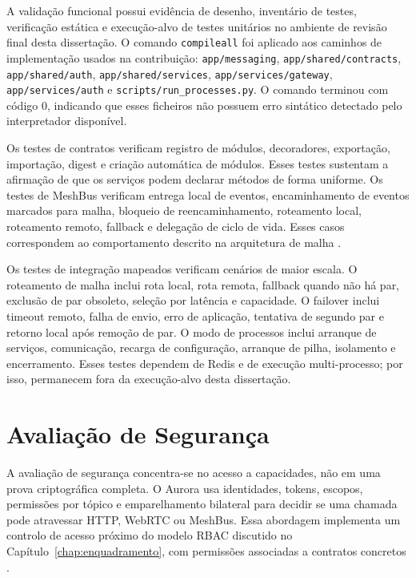 A valida\c{c}\~{a}o funcional possui evid\^{e}ncia de desenho, invent\'{a}rio de testes, verifica\c{c}\~{a}o est\'{a}tica e execu\c{c}\~{a}o-alvo de testes unit\'{a}rios no ambiente de revis\~{a}o final desta disserta\c{c}\~{a}o. O comando \texttt{compileall} foi aplicado aos caminhos de implementa\c{c}\~{a}o usados na contribui\c{c}\~{a}o: \verb|app/messaging|, \verb|app/shared/contracts|, \verb|app/shared/auth|, \verb|app/shared/services|, \verb|app/services/gateway|, \verb|app/services/auth| e \verb|scripts/run_processes.py|. O comando terminou com c\'{o}digo 0, indicando que esses ficheiros n\~{a}o possuem erro sint\'{a}tico detectado pelo interpretador dispon\'{i}vel.

Os testes de contratos verificam registro de m\'{o}dulos, decoradores, exporta\c{c}\~{a}o, importa\c{c}\~{a}o, digest e cria\c{c}\~{a}o autom\'{a}tica de m\'{o}dulos. Esses testes sustentam a afirma\c{c}\~{a}o de que os servi\c{c}os podem declarar m\'{e}todos de forma uniforme. Os testes de MeshBus verificam entrega local de eventos, encaminhamento de eventos marcados para malha, bloqueio de reencaminhamento, roteamento local, roteamento remoto, fallback e delega\c{c}\~{a}o de ciclo de vida. Esses casos correspondem ao comportamento descrito na arquitetura de malha \cite{aurora_handoff_doc}.

Os testes de integra\c{c}\~{a}o mapeados verificam cen\'{a}rios de maior escala. O roteamento de malha inclui rota local, rota remota, fallback quando n\~{a}o h\'{a} par, exclus\~{a}o de par obsoleto, sele\c{c}\~{a}o por lat\^{e}ncia e capacidade. O failover inclui timeout remoto, falha de envio, erro de aplica\c{c}\~{a}o, tentativa de segundo par e retorno local ap\'{o}s remo\c{c}\~{a}o de par. O modo de processos inclui arranque de servi\c{c}os, comunica\c{c}\~{a}o, recarga de configura\c{c}\~{a}o, arranque de pilha, isolamento e encerramento. Esses testes dependem de Redis e de execu\c{c}\~{a}o multi-processo; por isso, permanecem fora da execu\c{c}\~{a}o-alvo desta disserta\c{c}\~{a}o.

\section{Avalia\c{c}\~{a}o de Seguran\c{c}a}
\label{sec:avaliacao-seguranca}

A avalia\c{c}\~{a}o de seguran\c{c}a concentra-se no acesso a capacidades, n\~{a}o em uma prova criptogr\'{a}fica completa. O Aurora usa identidades, tokens, escopos, permiss\~{o}es por t\'{o}pico e emparelhamento bilateral para decidir se uma chamada pode atravessar HTTP, WebRTC ou MeshBus. Essa abordagem implementa um controlo de acesso pr\'{o}ximo do modelo RBAC discutido no Cap\'{i}tulo~\ref{chap:enquadramento}, com permiss\~{o}es associadas a contratos concretos \cite{nist_rbac_project,sandhu_ferraiolo_kuhn_2000}.

